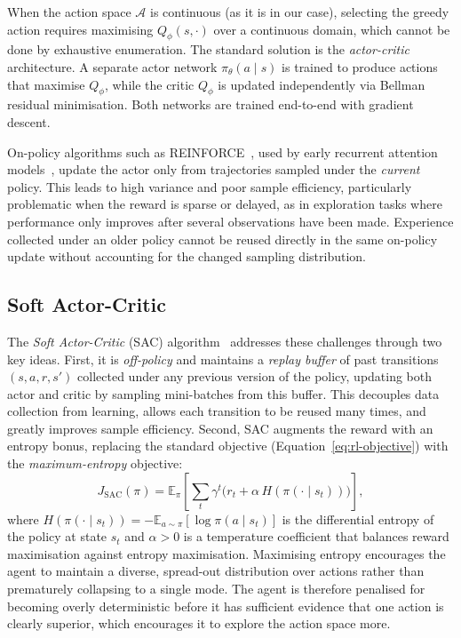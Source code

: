 When the action space $\mathcal{A}$ is continuous (as it is in our case), selecting the greedy action requires maximising $Q_\phi(s, \cdot)$ over a continuous domain, which cannot be done by exhaustive enumeration. The standard solution is the \emph{actor-critic} architecture. A separate actor network $\pi_\theta(a \mid s)$ is trained to produce actions that maximise $Q_\phi$, while the critic $Q_\phi$ is updated independently via Bellman residual minimisation. Both networks are trained end-to-end with gradient descent.

On-policy algorithms such as REINFORCE~\cite{williams1992simple}, used by early recurrent attention models~\cite{mnih2014recurrent}, update the actor only from trajectories sampled under the \emph{current} policy. This leads to high variance and poor sample efficiency, particularly problematic when the reward is sparse or delayed, as in exploration tasks where performance only improves after several observations have been made. Experience collected under an older policy cannot be reused directly in the same on-policy update without accounting for the changed sampling distribution.

\subsection{Soft Actor-Critic}
\label{sec:prelim-sac}
The \emph{Soft Actor-Critic} (SAC) algorithm~\cite{haarnoja2018soft} addresses these challenges through two key ideas. First, it is \emph{off-policy} and maintains a \emph{replay buffer} of past transitions $(s, a, r, s')$ collected under any previous version of the policy, updating both actor and critic by sampling mini-batches from this buffer. This decouples data collection from learning, allows each transition to be reused many times, and greatly improves sample efficiency. Second, SAC augments the reward with an entropy bonus, replacing the standard objective (Equation~\ref{eq:rl-objective}) with the \emph{maximum-entropy} objective:
\begin{equation}
    J_{\mathrm{SAC}}(\pi) = \mathbb{E}_{\pi}\!\left[\sum_t \gamma^t \bigl(r_t + \alpha\, H(\pi(\cdot \mid s_t))\bigr)\right],
    \label{eq:sac-objective}
\end{equation}
where $H(\pi(\cdot \mid s_t)) = -\mathbb{E}_{a \sim \pi}[\log \pi(a \mid s_t)]$ is the differential entropy of the policy at state $s_t$ and $\alpha > 0$ is a temperature coefficient that balances reward maximisation against entropy maximisation. Maximising entropy encourages the agent to maintain a diverse, spread-out distribution over actions rather than prematurely collapsing to a single mode. The agent is therefore penalised for becoming overly deterministic before it has sufficient evidence that one action is clearly superior, which encourages it to explore the action space more.

